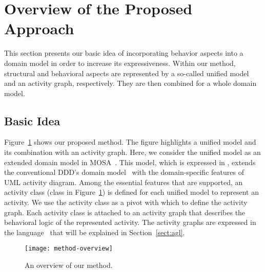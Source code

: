 \section{Overview of the Proposed Approach}
\label{sect:overviewApproach}

This section presents our basic idea of incorporating behavior aspects into a domain model in order to increase its expressiveness. Within our method, structural and behavioral aspects are represented by a so-called unified model and an activity graph, respectively. They are then combined for a whole domain model.

\subsection{Basic Idea}

%
%
Figure~\ref{fig:method-overview} shows our proposed method.
The figure highlights a unified model and its combination with an activity graph. Here, we consider the unified model as an extended domain model in MOSA~\cite{le_domain_2018}. This model, which is expressed in \dcsl, extends the conventional DDD's domain model~\cite{evans_domain-driven_2004} with the domain-specific features of UML activity diagram. Among the essential features that are supported, an activity class (\eg class  in Figure~\ref{fig:method-overview}) is defined for each unified model to represent an activity. We use the activity class as a pivot with which to define the activity graph. Each activity class is attached to an activity graph that describes the behavioral logic of the represented activity. The activity graphs are expressed in the language \agl~that will be explained in Section~\ref{sect:agl}.

\begin{figure}[ht]
	\begin{center}
		\texttt{[image: method-overview]}
	\end{center}
	\caption{An overview of our method.} %
	\label{fig:method-overview}
\end{figure}

